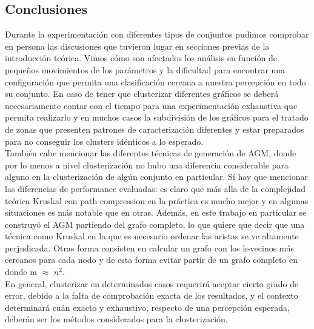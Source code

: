 \documentclass[11pt,a4paper]{article}
\begin{document}
\subsection{Conclusiones}
Durante la experimentación con diferentes tipos de conjuntos pudimos comprobar en persona las discusiones que tuvieron lugar en secciones previas de la introducción teórica. Vimos cómo son afectados los análisis en función de pequeños movimientos de los parámetros y la dificultad para encontrar una configuración que permita una clasificación cercana a nuestra percepción en todo su conjunto. En caso de tener que clusterizar diferentes gráficos se deberá necesariamente contar con el tiempo para una experimentación exhaustiva que permita realizarlo y en muchos casos la subdivisión de los gráficos para el tratado de zonas que presenten patrones de caracterización diferentes y estar preparados para no conseguir los clusters idénticos a lo esperado. 
\\ También cabe mencionar las diferentes técnicas de generación de AGM, donde por lo menos a nivel clusterización no hubo una diferencia considerable para alguno en la clusterización de algún conjunto en particular. Sí hay que mencionar las diferencias de performance evaluadas: es claro que más alla de la complejidad teórica Kruskal con path compression en la práctica es mucho mejor y en algunas situaciones es más notable que en otras. Además, en este trabajo en particular se construyó el AGM partiendo del grafo completo, lo que quiere que decir que una técnica como Kruskal en la que es necesario ordenar las aristas se ve altamente perjudicada. Otras forma consisten en calcular un grafo con los k-vecinos más  cercanos para cada nodo y de esta forma evitar partir de un grafo completo en donde m $\approx$ $n^{2}$.\\ En general, clusterizar en determinados casos requerirá aceptar cierto grado de error, debido a la falta de comprobación exacta de los resultados, y el contexto determinará cuán exacto y exhaustivo, respecto de una percepción esperada, deberán ser los métodos considerados para la clusterización.
\end{document}
